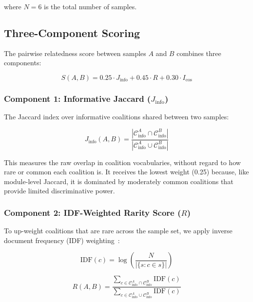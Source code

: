 \documentclass{../yalumba}
\begin{document}
\noindent where $N = 6$ is the total number of samples.

\subsection{Three-Component Scoring}
\label{sec:methods-scoring}

The pairwise relatedness score between samples $A$ and $B$ combines three
components:

\begin{equation}
  S(A, B) = 0.25 \cdot J_{\mathrm{info}} + 0.45 \cdot R + 0.30 \cdot I_{\cos}
  \label{eq:score}
\end{equation}

\subsubsection{Component 1: Informative Jaccard ($J_{\mathrm{info}}$)}

The Jaccard index over informative coalitions shared between two samples:

\begin{equation}
  J_{\mathrm{info}}(A, B) = \frac{|\mathcal{C}_{\mathrm{info}}^A \cap \mathcal{C}_{\mathrm{info}}^B|}{|\mathcal{C}_{\mathrm{info}}^A \cup \mathcal{C}_{\mathrm{info}}^B|}
  \label{eq:info-jaccard}
\end{equation}

This measures the raw overlap in coalition vocabularies, without regard to
how rare or common each coalition is.  It receives the lowest weight (0.25)
because, like module-level Jaccard, it is dominated by moderately common
coalitions that provide limited discriminative power.

\subsubsection{Component 2: IDF-Weighted Rarity Score ($R$)}

To up-weight coalitions that are rare across the sample set, we apply
inverse document frequency (IDF) weighting~\cite{salton1988tfidf}:

\begin{equation}
  \mathrm{IDF}(c) = \log\!\left(\frac{N}{|\{s : c \in s\}|}\right)
  \label{eq:idf}
\end{equation}

\begin{equation}
  R(A, B) = \frac{\sum_{c \in \mathcal{C}_{\mathrm{info}}^A \cap \mathcal{C}_{\mathrm{info}}^B} \mathrm{IDF}(c)}{\sum_{c \in \mathcal{C}_{\mathrm{info}}^A \cup \mathcal{C}_{\mathrm{info}}^B} \mathrm{IDF}(c)}
  \label{eq:rarity}
\end{equation}
\end{document}
